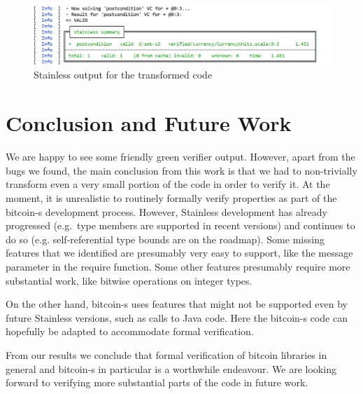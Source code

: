 \documentclass[runningheads]{llncs}
\begin{document}
\begin{figure}
	\centering
		\includegraphics[width=\textwidth]{result_output}
	\caption{Stainless output for the transformed code}
  \label{fig:result}
\end{figure}


\section{Conclusion and Future Work}

We are happy to see some friendly green verifier output. However,
apart from the bugs we found, the main conclusion from this work is
that we had to non-trivially transform even a very small portion of
the code in order to verify it. At the moment, it is unrealistic to
routinely formally verify properties as part of the bitcoin-s
development process. However, Stainless development has already
progressed (e.g.\ type members are supported in recent versions) and
continues to do so (e.g. self-referential type bounds are on the
roadmap). Some missing features that we identified are presumably very
easy to support, like the message parameter in the require
function. Some other features presumably require more substantial
work, like bitwise operations on integer types.

On the other hand, bitcoin-s uses features that might not be supported
even by future Stainless versions, such as calls to Java code. Here
the bitcoin-s code can hopefully be adapted to accommodate formal
verification.

From our results we conclude that formal verification of bitcoin
libraries in general and bitcoin-s in particular is a worthwhile
endeavour. We are looking forward to verifying more substantial parts
of the code in future work.





\clearpage
\appendix
\end{document}
